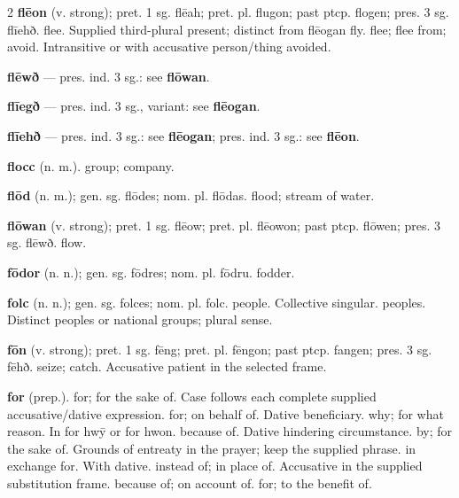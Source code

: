 \begin{multicols*}{2}
\textbf{flēon} (v. strong); pret. 1 sg. flēah; pret. pl. flugon; past ptcp. flogen; pres. 3 sg. flīehð. flee. Supplied third-plural present; distinct from flēogan fly. flee; flee from; avoid. Intransitive or with accusative person/thing avoided.\par
\textbf{flēwð} — pres. ind. 3 sg.: see \textbf{flōwan}.\par
\textbf{flīegð} — pres. ind. 3 sg., variant: see \textbf{flēogan}.\par
\textbf{flīehð} — pres. ind. 3 sg.: see \textbf{flēogan}; pres. ind. 3 sg.: see \textbf{flēon}.\par
\textbf{flocc} (n. m.). group; company.\par
\textbf{flōd} (n. m.); gen. sg. flōdes; nom. pl. flōdas. flood; stream of water.\par
\textbf{flōwan} (v. strong); pret. 1 sg. flēow; pret. pl. flēowon; past ptcp. flōwen; pres. 3 sg. flēwð. flow.\par
\textbf{fōdor} (n. n.); gen. sg. fōdres; nom. pl. fōdru. fodder.\par
\textbf{folc} (n. n.); gen. sg. folces; nom. pl. folc. people. Collective singular. peoples. Distinct peoples or national groups; plural sense.\par
\textbf{fōn} (v. strong); pret. 1 sg. fēng; pret. pl. fēngon; past ptcp. fangen; pres. 3 sg. fēhð. seize; catch. Accusative patient in the selected frame.\par
\textbf{for} (prep.). for; for the sake of. Case follows each complete supplied accusative/dative expression. for; on behalf of. Dative beneficiary. why; for what reason. In for hwȳ or for hwon. because of. Dative hindering circumstance. by; for the sake of. Grounds of entreaty in the prayer; keep the supplied phrase. in exchange for. With dative. instead of; in place of. Accusative in the supplied substitution frame. because of; on account of. for; to the benefit of.\par

\end{multicols*}
